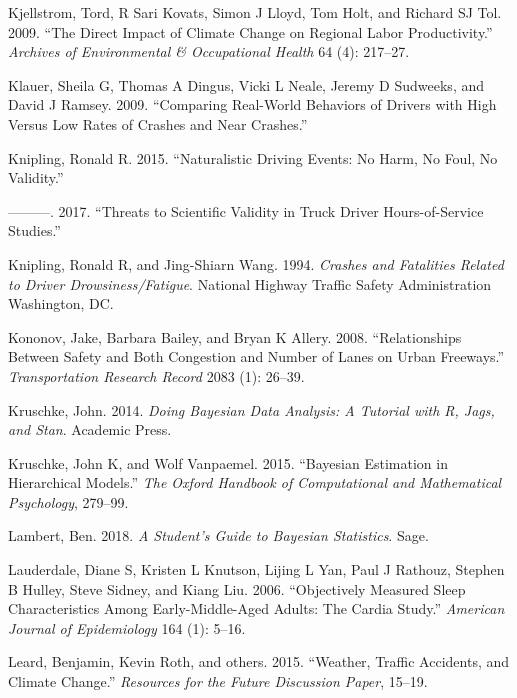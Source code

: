 \documentclass[12pt]{book}
\numberwithin{equation}{chapter}
\begin{document}
\leavevmode\hypertarget{ref-kjellstrom2009direct}{}%
Kjellstrom, Tord, R Sari Kovats, Simon J Lloyd, Tom Holt, and Richard SJ Tol. 2009. ``The Direct Impact of Climate Change on Regional Labor Productivity.'' \emph{Archives of Environmental \& Occupational Health} 64 (4): 217--27.

\leavevmode\hypertarget{ref-klauer2009comparing}{}%
Klauer, Sheila G, Thomas A Dingus, Vicki L Neale, Jeremy D Sudweeks, and David J Ramsey. 2009. ``Comparing Real-World Behaviors of Drivers with High Versus Low Rates of Crashes and Near Crashes.''

\leavevmode\hypertarget{ref-knipling2015naturalistic}{}%
Knipling, Ronald R. 2015. ``Naturalistic Driving Events: No Harm, No Foul, No Validity.''

\leavevmode\hypertarget{ref-knipling2017threats}{}%
---------. 2017. ``Threats to Scientific Validity in Truck Driver Hours-of-Service Studies.''

\leavevmode\hypertarget{ref-knipling1994crashes}{}%
Knipling, Ronald R, and Jing-Shiarn Wang. 1994. \emph{Crashes and Fatalities Related to Driver Drowsiness/Fatigue}. National Highway Traffic Safety Administration Washington, DC.

\leavevmode\hypertarget{ref-kononov2008relationships}{}%
Kononov, Jake, Barbara Bailey, and Bryan K Allery. 2008. ``Relationships Between Safety and Both Congestion and Number of Lanes on Urban Freeways.'' \emph{Transportation Research Record} 2083 (1): 26--39.

\leavevmode\hypertarget{ref-kruschke2014doing}{}%
Kruschke, John. 2014. \emph{Doing Bayesian Data Analysis: A Tutorial with R, Jags, and Stan}. Academic Press.

\leavevmode\hypertarget{ref-kruschke2015bayesian}{}%
Kruschke, John K, and Wolf Vanpaemel. 2015. ``Bayesian Estimation in Hierarchical Models.'' \emph{The Oxford Handbook of Computational and Mathematical Psychology}, 279--99.

\leavevmode\hypertarget{ref-lambert2018student}{}%
Lambert, Ben. 2018. \emph{A Student's Guide to Bayesian Statistics}. Sage.

\leavevmode\hypertarget{ref-lauderdale2006objectively}{}%
Lauderdale, Diane S, Kristen L Knutson, Lijing L Yan, Paul J Rathouz, Stephen B Hulley, Steve Sidney, and Kiang Liu. 2006. ``Objectively Measured Sleep Characteristics Among Early-Middle-Aged Adults: The Cardia Study.'' \emph{American Journal of Epidemiology} 164 (1): 5--16.

\leavevmode\hypertarget{ref-leard2015weather}{}%
Leard, Benjamin, Kevin Roth, and others. 2015. ``Weather, Traffic Accidents, and Climate Change.'' \emph{Resources for the Future Discussion Paper}, 15--19.
\end{document}

